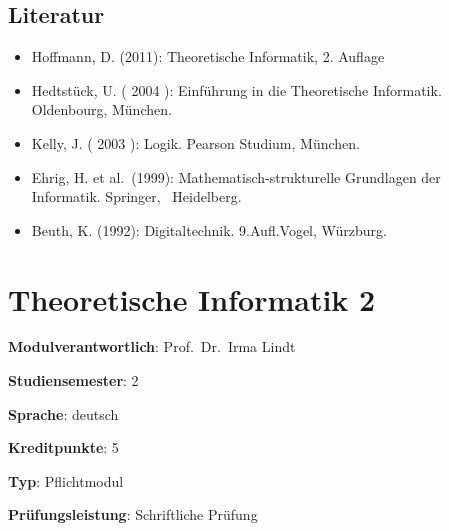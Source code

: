 \hypertarget{literaturpathlabelmi-2017modulbeschreibungen-bachelorba_theoretischeinformatik1}{%
\section*{Literatur\label{/mi-2017/modulbeschreibungen-bachelor/BA_TheoretischeInformatik1}}\label{literaturpathlabelmi-2017modulbeschreibungen-bachelorba_theoretischeinformatik1}}

\begin{itemize}
\tightlist
\item
  Hoffmann, D. (2011): Theoretische Informatik, 2. Auflage
\item
  Hedtstück, U. ( 2004 ): Einführung in die Theoretische Informatik.
  Oldenbourg, München.
\item
  Kelly, J. ( 2003 ): Logik. Pearson Studium, München.
\item
  Ehrig, H. et al.~(1999): Mathematisch-strukturelle Grundlagen der
  Informatik. Springer,~ Heidelberg.
\item
  Beuth, K. (1992): Digitaltechnik. 9.Aufl.Vogel, Würzburg.
\end{itemize}

\hypertarget{theoretische-informatik-2pathlabelmi-2017modulbeschreibungen-bachelorba_theoretischeinformatik2}{%
\chapter{Theoretische Informatik
2\label{/mi-2017/modulbeschreibungen-bachelor/BA_TheoretischeInformatik2}}\label{theoretische-informatik-2pathlabelmi-2017modulbeschreibungen-bachelorba_theoretischeinformatik2}}

\begin{modulHead}
\textbf{Modulverantwortlich}: Prof.~Dr.~Irma
Lindt
\end{modulHead}
\begin{modulHead}
\textbf{Studiensemester}:
2
\end{modulHead}
\begin{modulHead}
\textbf{Sprache}:
deutsch
\end{modulHead}
\begin{modulHead}
\textbf{Kreditpunkte}:
5
\end{modulHead}
\begin{modulHead}
\textbf{Typ}:
Pflichtmodul
\end{modulHead}
\begin{modulHead}
\textbf{Prüfungsleistung}:
Schriftliche Prüfung
\end{modulHead}



